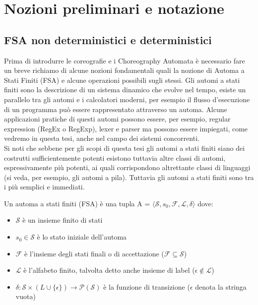 \chapter{Nozioni preliminari e notazione} \label{cap:Preliminaries}
\section{FSA non deterministici e deterministici}
Prima di introdurre le coreografie e i Choreography Automata è necessario fare un breve richiamo di alcune nozioni fondamentali quali la nozione di Automa a Stati Finiti (FSA)\cite{Linguaggi_di_Prorgammazione} e alcune operazioni possibili sugli stessi.
Gli automi a stati finiti sono la descrizione di un sistema dinamico che evolve nel tempo, esiste un parallelo tra gli automi e i calcolatori moderni, per esempio il flusso d'esecuzione di un programma può essere rappresentato attraverso un automa.
Alcune applicazioni pratiche di questi automi possono essere, per esempio, regular expression (RegEx o RegExp), lexer e parser ma possono essere impiegati, come vedremo in questa tesi, anche nel campo dei sistemi concorrenti.\\
Si noti che sebbene per gli scopi di questa tesi gli automi a stati finiti siano dei costrutti sufficientemente potenti esistono tuttavia altre classi di automi, espressivamente più potenti, ai quali corrispondono altrettante classi di linguaggi (si veda, per esempio, gli automi a pila). Tuttavia gli automi a stati finiti sono tra i più semplici e immediati.

\begin{definition}
    Un automa a stati finiti (FSA) è una tupla A = $\langle \mathcal{S}, s_0, \mathcal{F}, \mathcal{L}, \delta \rangle$ dove:
    \begin{itemize}
        \item $\mathcal{S}$ è un insieme finito di stati
        \item $s_0 \in \mathcal{S}$ è lo stato iniziale dell'automa
        \item $\mathcal{F}$ è l'insieme degli stati finali o di accettazione ($\mathcal{F} \subseteq \mathcal{S}$)
        \item $\mathcal{L}$ è l'alfabeto finito, talvolta detto anche insieme di label ($\epsilon \notin \mathcal{L}$)
        \item $\delta : \mathcal{S} \times (L \cup \{\epsilon\}) \rightarrow \mathcal{P}(\mathcal{S})$ è la funzione di transizione ($\epsilon$ denota la stringa vuota)
    \end{itemize}
\end{definition}


